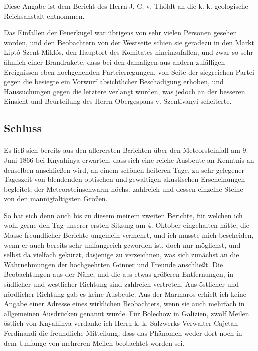 \documentclass[a4paper, 11pt, oneside, german]{article}
\begin{document}
Diese Angabe ist dem Bericht des Herrn J. C. v. Thóldt an die k. k. geologische Reichsanstalt entnommen.

Das Einfallen der Feuerkugel war übrigens von sehr vielen Personen gesehen worden, und den Beobachtern von der Westseite schien sie geradezu in den Markt Liptó Szent Miklós, den Hauptort des Komitates hineinzufallen, und zwar so sehr ähnlich einer Brandrakete, dass bei den damaligen aus andern zufälligen Ereignissen eben hochgehenden Parteierregungen, von Seite der siegreichen Partei gegen die besiegte ein Vorwurf absichtlicher Beschädigung erhoben, und Haussuchungen gegen die letztere verlangt wurden, was jedoch an der besseren Einsicht und Beurteilung des Herrn Obergespans v. Szentivanyi scheiterte.
\clearpage
\subsection{Schluss}
\paragraph{}
Es ließ sich bereits aus den allerersten Berichten über den Meteorsteinfall am 9. Juni 1866 bei Knyahinya erwarten, dass sich eine reiche Ausbeute an Kenntnis an denselben anschließen wird, an einem schönen heiteren Tage, zu sehr gelegener Tageszeit von blendenden optischen und gewaltigen akustischen Erscheinungen begleitet, der Meteorsteinschwarm höchst zahlreich und dessen einzelne Steine von den mannigfaltigsten Größen.

So hat sich denn auch bis zu diesem meinem zweiten Berichte, für welchen ich wohl gerne den Tag unserer ersten Sitzung am 4. Oktober eingehalten hätte, die Masse freundlicher Berichte ungemein vermehrt, und ich musste mich bescheiden, wenn er auch bereits sehr umfangreich geworden ist, doch nur möglichst, und selbst da vielfach gekürzt, dasjenige zu verzeichnen, was sich zunächst an die Wahrnehmungen der hochgeehrten Gönner und Freunde anschließt. Die Beobachtungen aus der Nähe, und die aus etwas größeren Entfernungen, in südlicher und westlicher Richtung sind zahlreich vertreten. Aus östlicher und nördlicher Richtung gab es keine Ausbeute. Aus der Marmaros erhielt ich keine Angabe einer Adresse eines wirklichen Beobachters, wenn sie auch mehrfach in allgemeinen Ausdrücken genannt wurde. Für Bolechow in Galizien, zwölf Meilen östlich von Knyahinya verdanke ich Herrn k. k. Salzwerks-Verwalter Cajetan Ferdinandi die freundliche Mitteilung, dass das Phänomen weder dort noch in dem Umfange von mehreren Meilen beobachtet worden sei.
\end{document}
